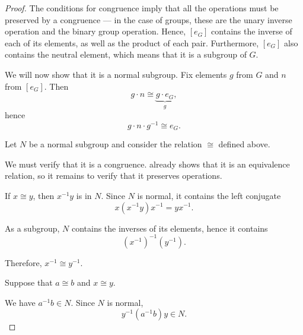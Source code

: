 \begin{proof}
   The conditions for congruence imply that all the operations must be preserved by a congruence --- in the case of groups, these are the unary inverse operation and the binary group operation. Hence, \( [e_G] \) contains the inverse of each of its elements, as well as the product of each pair. Furthermore, \( [e_G] \) also contains the neutral element, which means that it is a subgroup of \( G \).

  We will now show that it is a normal subgroup. Fix elements \( g \) from \( G \) and \( n \) from \( [e_G] \). Then
  \begin{equation*}
    g \cdot n \cong \underbrace{g \cdot e_G}_{g},
  \end{equation*}
  hence
  \begin{equation*}
    g \cdot n \cdot g^{-1} \cong e_G.
  \end{equation*}

   Let \( N \) be a normal subgroup and consider the relation \( {\cong} \) defined above.

  We must verify that it is a congruence.  already shows that it is an equivalence relation, so it remains to verify that it preserves operations.

   If \( x \cong y \), then \( x^{-1} y \) is in \( N \). Since \( N \) is normal, it contains the left conjugate
  \begin{equation*}
    x (x^{-1} y) x^{-1} = y x^{-1}.
  \end{equation*}

  As a subgroup, \( N \) contains the inverses of its elements, hence it contains
  \begin{equation*}
    (x^{-1})^{-1} (y^{-1}).
  \end{equation*}

  Therefore, \( x^{-1} \cong y^{-1} \).

   Suppose that \( a \cong b \) and \( x \cong y \).

  We have \( a^{-1} b \in N \). Since \( N \) is normal,
  \begin{equation*}
    y^{-1} (a^{-1} b) y \in N.
  \end{equation*}


\end{proof}

